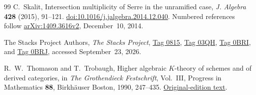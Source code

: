 \begin{thebibliography}{99}
C.~Skalit,
Intersection multiplicity of Serre in the unramified case,
\emph{J. Algebra} \textbf{428} (2015), 91--121.
\href{https://doi.org/10.1016/j.jalgebra.2014.12.040}{doi:10.1016/j.jalgebra.2014.12.040}.
Numbered references follow
\href{https://arxiv.org/abs/1409.3616v2}{arXiv:1409.3616v2},
December~10, 2014.

The Stacks Project Authors,
\emph{The Stacks Project},
\href{https://stacks.math.columbia.edu/tag/0815}{Tag 0815},
\href{https://stacks.math.columbia.edu/tag/03QH}{Tag 03QH},
\href{https://stacks.math.columbia.edu/tag/0BRI}{Tag 0BRI}, and
\href{https://stacks.math.columbia.edu/tag/0BRJ}{Tag 0BRJ},
accessed September~23, 2026.

R.~W.~Thomason and T.~Trobaugh,
Higher algebraic $K$-theory of schemes and of derived categories,
in \emph{The Grothendieck Festschrift}, Vol.~III,
Progress in Mathematics \textbf{88}, Birkh\"auser Boston, 1990, 247--435.
\href{https://www.sas.rochester.edu/mth/sites/doug-ravenel/otherpapers/Thomason-Trobaugh.pdf}{Original-edition text}.

\end{thebibliography}

